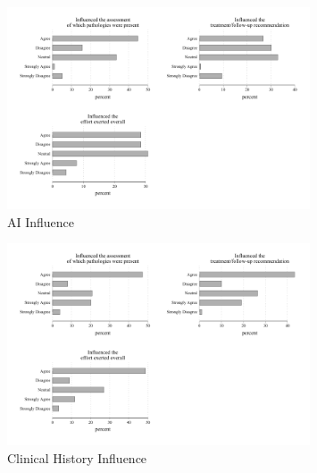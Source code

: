 \begin{figure}[H] 
\caption{AI Influence\label{fig:ai-influence}}
    \begin{center}
    \includegraphics[width=0.8\textwidth]{images/ai_influence.pdf}
    \end{center}
\end{figure}

\begin{figure}[H]
    \caption{Clinical History Influence\label{fig:ch-influence}}
    \begin{center}
    \includegraphics[width=0.8\textwidth]{images/ph_influence.pdf}
    \end{center}
\end{figure}
